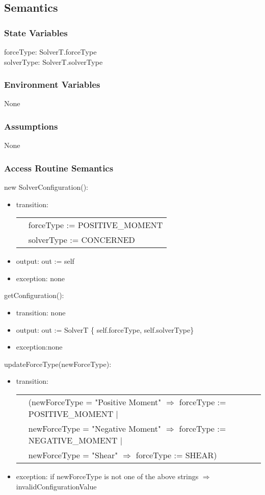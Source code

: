 \documentclass[12pt, titlepage]{article}
\begin{document}
\subsection{Semantics}

\subsubsection{State Variables}
forceType: SolverT.forceType\\
solverType: SolverT.solverType

\subsubsection{Environment Variables}
None
\subsubsection{Assumptions}
None
\subsubsection{Access Routine Semantics}

\noindent new SolverConfiguration():
\begin{itemize}
\item transition:\\
        \begin{tabular}{p{1cm} p{8cm}}
        & forceType := POSITIVE\_MOMENT\\
	& solverType := CONCERNED
        \end{tabular}
\item output: out := self
\item exception: none
\end{itemize}

\noindent getConfiguration():
\begin{itemize}
\item transition: none
\item output: out := SolverT \{ self.forceType, self.solverType\}
\item exception:none
\end{itemize}

\noindent updateForceType(newForceType):
\begin{itemize}
\item transition: \\
\begin{tabular}{p{1cm}p{16cm}}
& (newForceType = "Positive Moment" $\Rightarrow$ forceType := POSITIVE\_MOMENT $|$ \\
& newForceType = "Negative Moment" $\Rightarrow$ forceType := NEGATIVE\_MOMENT $|$\\
& newForceType = "Shear" $\Rightarrow$ forceType := SHEAR)\\
\end{tabular}
\item exception: if newForceType is not one of the above strings $\Rightarrow$ invalidConfigurationValue
\end{itemize}
\end{document}
